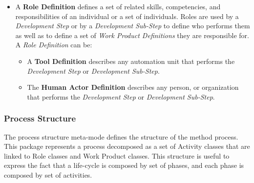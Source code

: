\begin{itemize}
\item A \textbf{Role Definition} defines a set of related skills, competencies, and responsibilities of an individual or a set of individuals. Roles are used by a \textit{Development Step} or by a \textit{Development Sub-Step} to define who performs them as well as to define a set of \textit{Work Product Definitions} they are responsible for. A \textit{Role Definition} can be:
\begin{itemize}
\item A \textbf{Tool Definition} describes any automation unit that performs the \textit{Development Step} or \textit{Development Sub-Step}.
\item The \textbf{Human Actor Definition} describes any person, or organization that performs the \textit{Development Step} or \textit{Development Sub-Step}.
\end{itemize}
\end{itemize}

\subsubsection{Process Structure}

The process structure meta-mode defines the structure of the method process. This package represents a process decomposed as a set of Activity classes that are linked to Role classes and Work Product classes. This structure is useful to express the fact that a life-cycle is composed by set of phases, and each phase is composed by set of activities.


